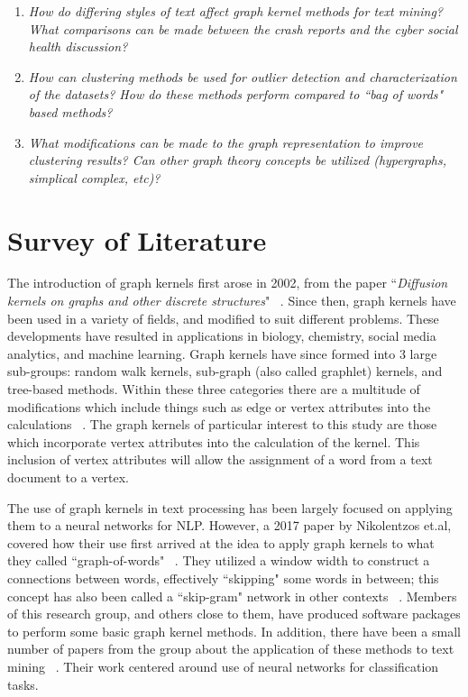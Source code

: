 \documentclass[11pt]{report}
\begin{document}
\begin{enumerate}

	\item \textit{How do differing styles of text affect graph kernel methods for text mining? What comparisons can be made between the crash reports and the cyber social health discussion?}
	\item \textit{How can clustering methods be used for outlier detection and characterization of the datasets? How do these methods perform compared to ``bag of words" based methods?}
	\item \textit{What modifications can be made to the graph representation to improve clustering results? Can other graph theory concepts be utilized (hypergraphs, simplical complex, etc)?}

\end{enumerate}

\section{Survey of Literature}


The introduction of graph kernels first arose in 2002, from the paper ``\textit{Diffusion kernels on graphs and other discrete structures}" ~\cite{kondor2002diffusion}. Since then, graph kernels have been used in a variety of fields, and modified to suit different problems. These developments have resulted in applications in biology, chemistry, social media analytics, and machine learning. Graph kernels have since formed into 3 large sub-groups: random walk kernels, sub-graph (also called graphlet) kernels, and tree-based methods. Within these three categories there are a multitude of modifications which include things such as edge or vertex attributes into the calculations ~\cite{vishwanathan2010graph}. The graph kernels of particular interest to this study are those which incorporate vertex attributes into the calculation of the kernel.  This inclusion of vertex attributes will allow the assignment of a word from a text document to a vertex. 

The use of graph kernels in text processing has been largely focused on applying them to a neural networks for NLP. However, a 2017 paper by Nikolentzos et.al, covered how their use first arrived at the idea to apply graph kernels to what they called ``graph-of-words" ~\cite{nikolentzos2017shortest}. They utilized a window width to construct a connections between words, effectively ``skipping" some words in between; this concept has also been called a ``skip-gram" network in other contexts ~\cite{cheng2006n}. Members of this research group, and others close to them, have produced software packages to perform some basic graph kernel methods. In addition, there have been a small number of papers from the group about the application of these methods to text mining ~\cite{sugiyama2018graphkernels}. Their work centered around use of neural networks for classification tasks. 
\end{document}
